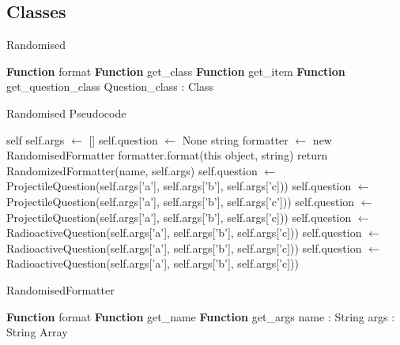 \subsection{Classes}
\algrenewcommand{}
\begin{algorithm}[H]\label{randomised}
	\caption{Randomised}
	\begin{algorithmic}[1]
		\public
		\State \textbf{Function} format
		\State \textbf{Function} get\_class
		\State \textbf{Function} get\_item
		\State \textbf{Function} get\_question\_class 
		\endpublic
		\private
		\State Question\_class : Class
		\endprivate
		\EndProcedure
	\end{algorithmic}
\end{algorithm}
\begin{algorithm}[H]\label{randomisedps}
	\caption{Randomised Pseudocode}
	\begin{algorithmic}[1]
		 {self}
		\State self.args $\gets$ []
		\State self.question $\gets$ None
		\EndFunction
		 {string}
		\State formatter $\gets$ new RandomisedFormatter
		\State formatter.format(this object, string)
		\EndFunction
		\State return RandomizedFormatter(name, self.args)
		\EndFunction
		\State self.question $\gets$ ProjectileQuestion(self.args['a'], self.args['b'], self.args['c]))
		\EndIf
		\State self.question $\gets$ ProjectileQuestion(self.args['a'], self.args['b'], self.args['c']))
		\EndIf
		\State self.question $\gets$ ProjectileQuestion(self.args['a'], self.args['b'], self.args['c]))
		\EndIf
		\State self.question $\gets$ RadioactiveQuestion(self.args['a'], self.args['b'], self.args['c]))
		\EndIf
		\State self.question $\gets$ RadioactiveQuestion(self.args['a'], self.args['b'], self.args['c]))
		\EndIf
		\State self.question $\gets$ RadioactiveQuestion(self.args['a'], self.args['b'], self.args['c]))
		\EndIf
		\EndFunction
		\EndProcedure
	\end{algorithmic}
\end{algorithm}
\begin{algorithm}[H]\label{randomisedFormatter}
	\caption{RandomisedFormatter}
	\begin{algorithmic}[1]
		\public
		\State \textbf{Function} format
		\State \textbf{Function} get\_name
		\State \textbf{Function} get\_args
		\endpublic
		\private
		\State name : String
		\State args : String Array
		\endprivate
		\EndProcedure
	\end{algorithmic}
\end{algorithm}
